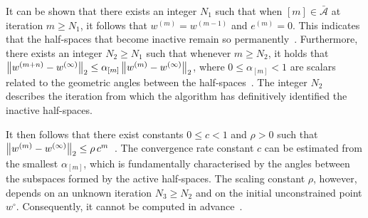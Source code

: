 It can be shown that there exists an integer $N_1$ such that when $[m] \in \bar{\mathcal{A}}$ at iteration $m \geq N_1$, it follows that $w^{(m)} = w^{(m-1)}$ and $e^{(m)} = 0$. This indicates that the half-spaces that become inactive remain so permanently~\cite[Lemma~3.1]{DYKSTRAPOLY}. Furthermore, there exists an integer $N_2 \geq N_1$ such that whenever $m \geq N_2$, it holds that $\left\| w^{(m+n)} - w^{(\infty)} \right\|_2 \leq \alpha_{[m]} \left\| w^{(m)} - w^{(\infty)} \right\|_2$, where $0 \leq \alpha_{[m]} < 1$ are scalars related to the geometric angles between the half-spaces~\cite[Lemma~3.7]{DYKSTRAPOLY}. The integer $N_2$ describes the iteration from which the algorithm has definitively identified the inactive half-spaces. 

It then follows that there exist constants $0 \leq c < 1$ and $\rho > 0$ such that \newline $\left\| w^{(m)} - w^{(\infty)} \right\|_2 \leq \rho\, c^m$~\cite[Thm.~3.8]{DYKSTRAPOLY}. The convergence rate constant $c$ can be estimated from the smallest $\alpha_{[m]}$, which is fundamentally characterised by the angles between the subspaces formed by the active half-spaces. The scaling constant $\rho$, however, depends on an unknown iteration $N_3 \geq N_2$ and on the initial unconstrained point $w^\circ$. Consequently, it cannot be computed in advance~\cite{DYKSTRAPERKINS,XUPOLY}.




